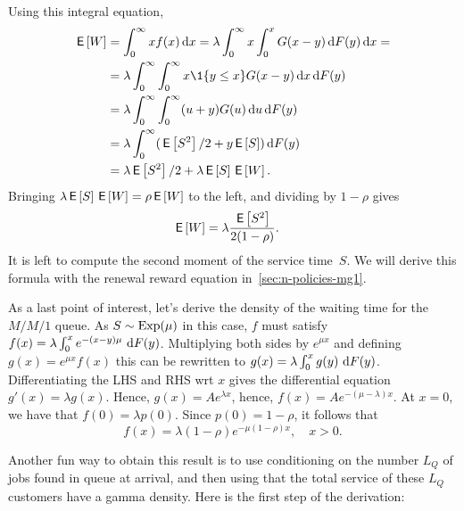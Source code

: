 \documentclass[queueing-book.tex]{subfiles}
\begin{document}
Using this integral equation,
\begin{align*}
  \E W
  &=    \int_0^{\infty} x f(x) \d x
  = \lambda \int_0^{\infty} x \int_0^{x} G(x-y) \d F(y) \d x= \\
  &= \lambda \int_0^{\infty} \int_0^{\infty} x \1{y \leq x} G(x-y) \d x \d F(y) \\
  &= \lambda \int_0^{\infty} \int_0^{\infty} (u+y) G(u) \d u \d F(y) \\
  &= \lambda \int_0^{\infty} (\E{S^2}/2 + y \E S) \d F(y) \\
  &= \lambda \E{S^2}/2 + \lambda \E S \E W. %
\end{align*}
Bringing $\lambda \,\mathsf{E}\left[S\right] \,\mathsf{E}\left[W\right] = \rho \,\mathsf{E}\left[W\right]$ to the left, and dividing by $1-\rho$ gives
\begin{align*}
  \,\mathsf{E}\left[W\right]  &= \lambda \frac{\,\mathsf{E}\left[S^2\right]}{2(1-\rho)}.
\end{align*}
It is left to compute the second moment of the service time~$S$. We will derive this formula with the renewal reward equation in~\cref{sec:n-policies-mg1}.

As a last point of interest, let's derive the density of the waiting time for the $M/M/1$ queue.
As $S\sim \mathrm{Exp}(\mu)$ in this case, $f$ must satisfy $f(x) =  \lambda \int_0^x  e^{-(x-y)\mu} \,\,\textrm{d}F(y)$.
Multiplying both sides by $e^{\mu x}$ and defining $g(x) = e^{\mu x} f(x)$ this can be rewritten to
$g(x) = \lambda \int_0^x g(y) \,\,\textrm{d}F(y)$.
Differentiating the LHS and RHS wrt $x$ gives the differential equation $g'(x) = \lambda g(x)$. Hence, $g(x) = A e^{\lambda x}$, hence,
$f(x) = A e^{-(\mu-\lambda)x}$.  At $x=0$, we have that $f(0) = \lambda p(0)$.
Since $p(0)=1-\rho$, it follows that
\begin{equation}\label{eq:l22}
f(x) = \lambda(1-\rho) e^{- \mu(1-\rho)x}, \quad x > 0.
\end{equation}

Another fun way to obtain this result is to use conditioning on the number $L_Q$ of jobs found in queue at arrival, and then using that the total service of these $L_Q$ customers have a gamma density. Here is the first step of the derivation:
\end{document}
